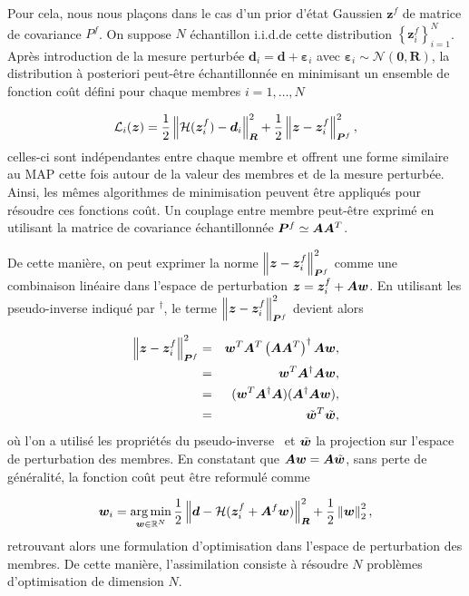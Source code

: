 Pour cela, nous nous plaçons dans le cas d'un prior d'état Gaussien $\bm z^f$ de matrice de covariance $P^f$. On suppose $N$ échantillon i.i.d.de cette distribution $\left\{\bm z^f_i\right\}_{i=1}^N$. Après introduction de la mesure perturbée $\bm d_i = \bm d + \bm \varepsilon_i$ avec $\bm \varepsilon_i \sim \mathcal{N}(\bm 0, \bm R)$, la distribution à posteriori peut-être échantillonnée en minimisant un ensemble de fonction coût défini pour chaque membres $i = 1, \dots, N$

\begin{equation*}
    \mathcal L_i(\bm z) = \frac12 \left\lVert \mathcal H (\bm z^f_i) - \bm d_i \right\rVert_{\bm R}^2 + \frac12 \left\lVert \bm z -\bm z^f_i \right\rVert^2_{\bm P^f},
\end{equation*}celles-ci sont indépendantes entre chaque membre et offrent une forme similaire au MAP cette fois autour de la valeur des membres et de la mesure perturbée. Ainsi, les mêmes algorithmes de minimisation peuvent être appliqués pour résoudre ces fonctions coût. Un couplage entre membre peut-être exprimé en utilisant la matrice de covariance échantillonnée $\bm P^f\simeq \bm A \bm A^T$.

De cette manière, on peut exprimer la norme $\left\lVert \bm z -\bm z^f_i \right\rVert^2_{\bm P^f}$ comme une combinaison linéaire dans l'espace de perturbation $\bm z = \bm z^f_i + \bm A \bm w$. En utilisant les pseudo-inverse indiqué par $^\dagger$, le terme $\left\lVert \bm z -\bm z^f_i \right\rVert^2_{\bm P^f}$ devient alors

\begin{eqnarray*}
    \left\lVert \bm z -\bm z^f_i \right\rVert^2_{\bm P^f} &=&  \bm w^T \bm A^T\left(\bm A \bm A^T\right)^\dagger \bm A \bm w,\\
    &=&\bm w^T \bm A^\dagger  \bm A \bm w,\\
    &=&(\bm w^T \bm A^\dagger  \bm A) (\bm A^\dagger  \bm A \bm w), \\
    &=& \tilde{\bm w}^T \tilde{\bm w},
\end{eqnarray*}où l'on a utilisé les propriétés du pseudo-inverse~\cite{ben-israel2003generalized} et $\tilde{\bm w}$ la projection sur l'espace de perturbation des membres. En constatant que $\bm A \bm w =\bm A \tilde{\bm w}$, sans perte de généralité, la fonction coût peut être reformulé comme

\begin{equation*}
    \bm w_i = \operatorname*{arg\,min}_{\bm w \in \mathbb R^N} \frac12 \left\lVert \bm d - \mathcal H(\bm{z}_i^f + \bm A^f \bm w) \right\rVert^2_{\bm R} + \frac12 \left\lVert \bm w \right\rVert_2^2,
\end{equation*}retrouvant alors une formulation d'optimisation dans l'espace de perturbation des membres. De cette manière, l'assimilation consiste à résoudre $N$ problèmes d'optimisation de dimension $N$.

